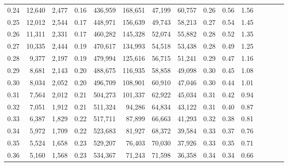 \begin{tabular}{rrrcrrrrrrrrrrr}
0.24 &  12,640 &  2,477 &                                       0.16 &  436,959 &  168,651 &   47,199 &   60,757 &  0.26 &  0.56 &                         1.56 \\
0.25 &  12,012 &  2,544 &                                       0.17 &  448,971 &  156,639 &   49,743 &   58,213 &  0.27 &  0.54 &                         1.45 \\
0.26 &  11,311 &  2,331 &                                       0.17 &  460,282 &  145,328 &   52,074 &   55,882 &  0.28 &  0.52 &                         1.35 \\
0.27 &  10,335 &  2,444 &                                       0.19 &  470,617 &  134,993 &   54,518 &   53,438 &  0.28 &  0.49 &                         1.25 \\
0.28 &   9,377 &  2,197 &                                       0.19 &  479,994 &  125,616 &   56,715 &   51,241 &  0.29 &  0.47 &                         1.16 \\
0.29 &   8,681 &  2,143 &                                       0.20 &  488,675 &  116,935 &   58,858 &   49,098 &  0.30 &  0.45 &                         1.08 \\
0.30 &   8,034 &  2,052 &                                       0.20 &  496,709 &  108,901 &   60,910 &   47,046 &  0.30 &  0.44 &                         1.01 \\
0.31 &   7,564 &  2,012 &                                       0.21 &  504,273 &  101,337 &   62,922 &   45,034 &  0.31 &  0.42 &                         0.94 \\
0.32 &   7,051 &  1,912 &                                       0.21 &  511,324 &   94,286 &   64,834 &   43,122 &  0.31 &  0.40 &                         0.87 \\
0.33 &   6,387 &  1,829 &                                       0.22 &  517,711 &   87,899 &   66,663 &   41,293 &  0.32 &  0.38 &                         0.81 \\
0.34 &   5,972 &  1,709 &                                       0.22 &  523,683 &   81,927 &   68,372 &   39,584 &  0.33 &  0.37 &                         0.76 \\
0.35 &   5,524 &  1,658 &                                       0.23 &  529,207 &   76,403 &   70,030 &   37,926 &  0.33 &  0.35 &                         0.71 \\
0.36 &   5,160 &  1,568 &                                       0.23 &  534,367 &   71,243 &   71,598 &   36,358 &  0.34 &  0.34 &                         0.66 \\

\end{tabular}
